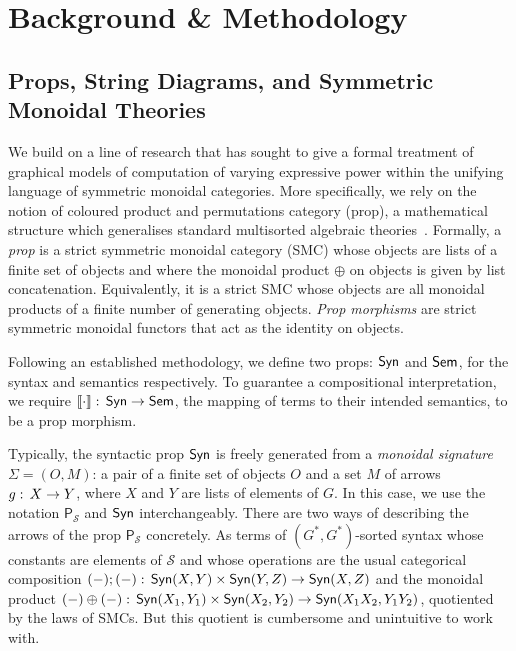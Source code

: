 \documentclass{lmcs}
\theoremstyle{plain}\newtheorem{satz}[thm]{Satz} %
\begin{document}
\appendix

\vfill

\section{Background \& Methodology}\label{app:method}
\subsection{Props, String Diagrams, and Symmetric Monoidal Theories}\label{sec:smt}

We build on a line of research that has sought to give a formal treatment of graphical models of computation of varying expressive power within the unifying language of symmetric monoidal categories. More specifically, we rely on the notion of coloured product and permutations category (prop), a mathematical structure which generalises standard multisorted algebraic theories~\cite{bonchi2018deconstructing}. Formally, a \emph{prop} is a strict symmetric monoidal category (SMC) whose objects are lists of a finite set of objects and where the monoidal product $\oplus$ on objects is given by list concatenation. Equivalently, it is a strict SMC whose objects are all monoidal products of a finite number of generating objects. \emph{Prop morphisms} are strict symmetric monoidal functors that act as the identity on objects.

Following an established methodology, we define two props: $\mathsf{Syn}$ and $\mathsf{Sem}$, for the syntax and semantics respectively. To guarantee a compositional interpretation, we require $\left\llbracket{\cdot}\right\rrbracket\mathrel{:}\,\mathsf{Syn}\to\mathsf{Sem}$, the mapping of terms to their intended semantics, to be a prop morphism.

Typically, the syntactic prop $\mathsf{Syn}$ is freely generated from a \emph{monoidal signature} $\Sigma = (O,M)$: a pair of a finite set of objects $O$ and a set $M$ of arrows $g\mathrel{:}\, X \to Y$, where $X$ and $Y$ are lists of elements of $G$. In this case, we use the notation $\mathsf{P}_\mathcal{S}$ and $\mathsf{Syn}$ interchangeably. There are two ways of describing the arrows of the prop $\mathsf{P}_\mathcal{S}$ concretely. As terms of $(G^*,G^*)$-sorted syntax whose constants are elements of $\mathcal{S}$ and whose operations are the usual categorical composition $(-);(-)\mathrel{:}\, \mathsf{Syn}(X,Y)\times \mathsf{Syn}(Y,Z)\to \mathsf{Syn}(X,Z)$ and the monoidal product $(-)\oplus(-)\mathrel{:}\, \mathsf{Syn}(X_1,Y_1)\times \mathsf{Syn}(X_2,Y_2)\to \mathsf{Syn}(X_1 X_2,Y_1 Y_2)$, quotiented by the laws of SMCs. But this quotient is cumbersome and unintuitive to work with.
\end{document}
